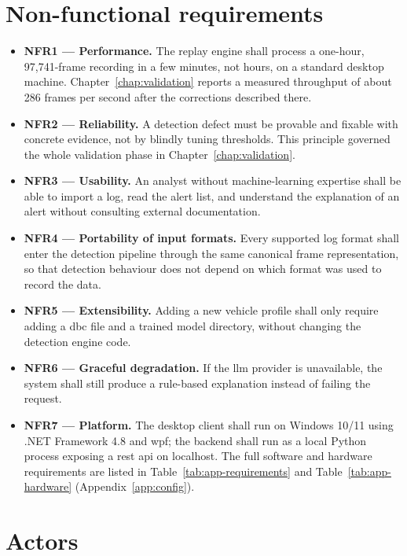 \section{Non-functional requirements}

\begin{itemize}
    \item \textbf{NFR1 --- Performance.} The replay engine shall process a one-hour, 97{,}741-frame recording in a few minutes, not hours, on a standard desktop machine. Chapter~\ref{chap:validation} reports a measured throughput of about 286 frames per second after the corrections described there.
    \item \textbf{NFR2 --- Reliability.} A detection defect must be provable and fixable with concrete evidence, not by blindly tuning thresholds. This principle governed the whole validation phase in Chapter~\ref{chap:validation}.
    \item \textbf{NFR3 --- Usability.} An analyst without machine-learning expertise shall be able to import a log, read the alert list, and understand the explanation of an alert without consulting external documentation.
    \item \textbf{NFR4 --- Portability of input formats.} Every supported log format shall enter the detection pipeline through the same canonical frame representation, so that detection behaviour does not depend on which format was used to record the data.
    \item \textbf{NFR5 --- Extensibility.} Adding a new vehicle profile shall only require adding a \gls{dbc} file and a trained model directory, without changing the detection engine code.
    \item \textbf{NFR6 --- Graceful degradation.} If the \gls{llm} provider is unavailable, the system shall still produce a rule-based explanation instead of failing the request.
    \item \textbf{NFR7 --- Platform.} The desktop client shall run on Windows 10/11 using .NET Framework 4.8 and \gls{wpf}; the backend shall run as a local Python process exposing a \gls{rest} \gls{api} on localhost. The full software and hardware requirements are listed in Table~\ref{tab:app-requirements} and Table~\ref{tab:app-hardware} (Appendix~\ref{app:config}).
\end{itemize}

\section{Actors}


